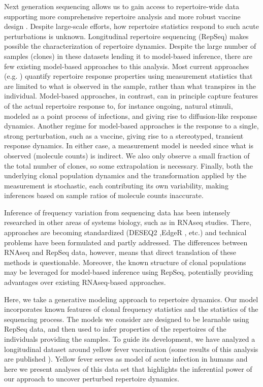 Next generation sequencing allows us to gain access to repertoire-wide data supporting more comprehensive repertoire analysis and more robust vaccine design \citep{Benichou2011}. 
Despite large-scale efforts\citep{Glanville2017}, how repertoire statistics respond to such acute perturbations is unknown. 
Longitudinal repertoire sequencing (RepSeq) makes possible the characterization of repertoire dynamics. 
Despite the large number of samples (clones) in these datasets lending it to model-based inference, there are few existing model-based approaches to this analysis. 
Most current approaches (e.g. \citep{Chu2019}) quantify repertoire response properties using measurement statistics that are limited to what is observed in the sample, rather than what transpires in the individual.
Model-based approaches, in contrast, can in principle capture features of the actual repertoire response to, for instance ongoing, natural stimuli, modeled as a point process of infections, and giving rise to diffusion-like response dynamics. 
Another regime for model-based approaches is the response to a single, strong perturbation, such as a vaccine, giving rise to a stereotyped, transient response dynamics.
In either case, a measurement model is needed since what is observed (molecule counts) is indirect.
We also only observe a small fraction of the total number of clones, so some extrapolation is necessary. 
Finally, both the underlying clonal population dynamics and the transformation applied by the measurement is stochastic, each contributing its own variability, making inferences based on sample ratios of molecule counts inaccurate.

Inference of frequency variation from sequencing data has been intensely researched in other areas of systems biology, such as in RNAseq studies. There, approaches are becoming standardized (DESEQ2 \citep{Love2014},EdgeR \citep{Robinson2008}, etc.) and technical problems have been formulated and partly addressed.
The differences between RNAseq and RepSeq data, however, means that direct translation of these methods is questionable. Moreover, the known structure of clonal populations may be leveraged for model-based inference using RepSeq, potentially providing advantages over existing RNAseq-based approaches.

Here, we take a generative modeling approach to repertoire dynamics. Our model incorporates known features of clonal frequency statistics and the statistics of the sequencing process. The models we consider are designed to be learnable using RepSeq data, and then used to infer properties of the repertoires of the individuals providing the samples. To guide its development, we have analyzed a longitudinal dataset around yellow fever vaccination (some results of this analysis are published \citep{Pogorelyy12704}). Yellow fever serves as model of acute infection in humans and here we present analyses of this data set that highlights the inferential power of our approach to uncover perturbed repertoire dynamics. 

